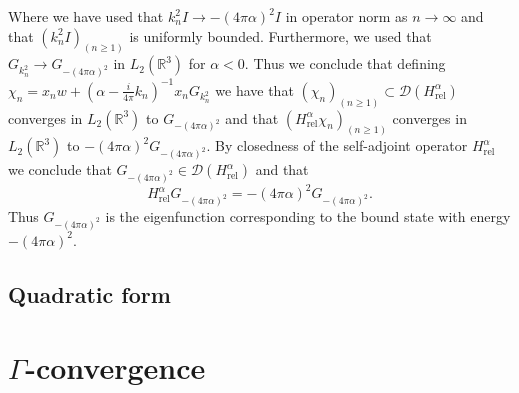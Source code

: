 \documentclass[a4paper,11pt]{article}
\newcommand{\dom}[1]{\mathscr D\left(#1\right)}
\newcommand{\R}{\mathbb{R}}
\begin{document}
Where we have used that $ k_n^2I\to-(4\pi\alpha)^2I $ in operator norm as $ n\to \infty $ and that $ (k_n^2I)_{(n\geq1)} $ is uniformly bounded. Furthermore, we used that $ G_{k_n^2}\to G_{-(4\pi\alpha)^2} $ in $ L_2(\R^3) $ for $ \alpha<0 $. Thus we conclude that defining $ \chi_n=x_nw+(\alpha-\frac{i}{4\pi}k_n)^{-1}x_nG_{k_n^2} $ we have that $ \left(\chi_n\right)_{(n\geq1)}\subset\dom{H_{\text{rel}}^\alpha} $ converges in $ L_2(\R^3) $ to $ G_{-(4\pi\alpha)^2} $ and that $ \left(H_{\text{rel}}^\alpha\chi_n\right)_{(n\geq1)} $ converges in $ L_2(\R^3) $ to $ -(4\pi\alpha)^2G_{-(4\pi\alpha)^2} $. By closedness of the self-adjoint operator $ H_{\text{rel}}^\alpha $ we conclude that $ G_{-(4\pi\alpha)^2}\in\dom{H_{\text{rel}}^\alpha} $ and that\begin{equation}
H_{\text{rel}}^\alpha G_{-(4\pi\alpha)^2}=-(4\pi\alpha)^2G_{-(4\pi\alpha)^2}.
\end{equation}
Thus $ G_{-(4\pi\alpha)^2} $ is the eigenfunction corresponding to the bound state with energy $ -(4\pi\alpha)^2 $.
\subsection{Quadratic form}
\section{$ \Gamma $-convergence}


\end{document}
